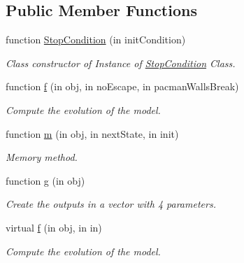 \subsection*{Public Member Functions}
\begin{DoxyCompactItemize}
\item 
function \hyperlink{class_stop_condition_a998151731b2f85cb0f3e0cbc7d82bf96}{Stop\+Condition} (in init\+Condition)
\begin{DoxyCompactList}\small\item\em Class constructor of Instance of \hyperlink{class_stop_condition}{Stop\+Condition} Class. \end{DoxyCompactList}\item 
function \hyperlink{class_stop_condition_abcffcbb16870f569058af2fd7823c5dd}{f} (in obj, in no\+Escape, in pacman\+Walls\+Break)
\begin{DoxyCompactList}\small\item\em Compute the evolution of the model. \end{DoxyCompactList}\item 
function \hyperlink{class_stop_condition_a3140f24c6c4b80037b7d4f521c6ae2d3}{m} (in obj, in next\+State, in init)
\begin{DoxyCompactList}\small\item\em Memory method. \end{DoxyCompactList}\item 
function \hyperlink{class_stop_condition_a07dadfabe92bf9a144b8a862720e7746}{g} (in obj)
\begin{DoxyCompactList}\small\item\em Create the outputs in a vector with 4 parameters. \end{DoxyCompactList}\item 
virtual \hyperlink{class_model_s_e_d_ac36f9451c43b120828af4380858f2024}{f} (in obj, in in)
\begin{DoxyCompactList}\small\item\em Compute the evolution of the model. \end{DoxyCompactList}\end{DoxyCompactItemize}
